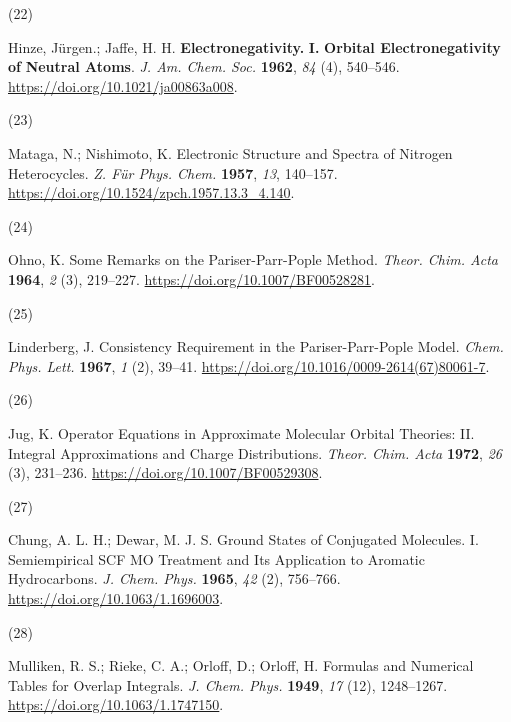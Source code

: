 \documentclass[
  number,
  3p]{elsarticle}
\newlength{\cslhangindent}
\newlength{\csllabelwidth}
\newlength{\cslentryspacingunit} %
\newenvironment{CSLReferences}[2] %
 {%
  \setlength{\parindent}{0pt}
  \ifodd #1
  \let\oldpar\par
  \def\par{\hangindent=\cslhangindent\oldpar}
  \fi
  \setlength{\parskip}{#2\cslentryspacingunit}
 }%
 {}
\newcommand{\CSLLeftMargin}[1]{\parbox[t]{\csllabelwidth}{#1}}
\newcommand{\CSLRightInline}[1]{\parbox[t]{\linewidth - \csllabelwidth}{#1}\break}
\begin{document}
\begin{CSLReferences}{0}{0}
\leavevmode{}%
\CSLLeftMargin{(22) }%
\CSLRightInline{Hinze, Jürgen.; Jaffe, H. H. \textbf{Electronegativity.}
{\textbf{I}}\textbf{.} {\textbf{Orbital Electronegativity}} \textbf{of}
{\textbf{Neutral Atoms}}. \emph{J. Am. Chem. Soc.} \textbf{1962},
\emph{84} (4), 540--546. \url{https://doi.org/10.1021/ja00863a008}.}

\leavevmode{}%
\CSLLeftMargin{(23) }%
\CSLRightInline{Mataga, N.; Nishimoto, K. Electronic {Structure} and
{Spectra} of {Nitrogen Heterocycles}. \emph{Z. Für Phys. Chem.}
\textbf{1957}, \emph{13}, 140--157.
\url{https://doi.org/10.1524/zpch.1957.13.3_4.140}.}

\leavevmode{}%
\CSLLeftMargin{(24) }%
\CSLRightInline{Ohno, K. Some Remarks on the {Pariser-Parr-Pople}
Method. \emph{Theor. Chim. Acta} \textbf{1964}, \emph{2} (3), 219--227.
\url{https://doi.org/10.1007/BF00528281}.}

\leavevmode{}%
\CSLLeftMargin{(25) }%
\CSLRightInline{Linderberg, J. Consistency Requirement in the
{Pariser-Parr-Pople} Model. \emph{Chem. Phys. Lett.} \textbf{1967},
\emph{1} (2), 39--41.
\url{https://doi.org/10.1016/0009-2614(67)80061-7}.}

\leavevmode{}%
\CSLLeftMargin{(26) }%
\CSLRightInline{Jug, K. Operator Equations in Approximate Molecular
Orbital Theories: {II}. {Integral} Approximations and Charge
Distributions. \emph{Theor. Chim. Acta} \textbf{1972}, \emph{26} (3),
231--236. \url{https://doi.org/10.1007/BF00529308}.}

\leavevmode{}%
\CSLLeftMargin{(27) }%
\CSLRightInline{Chung, A. L. H.; Dewar, M. J. S. Ground {States} of
{Conjugated Molecules}. {I}. {Semiempirical SCF MO Treatment} and {Its
Application} to {Aromatic Hydrocarbons}. \emph{J. Chem. Phys.}
\textbf{1965}, \emph{42} (2), 756--766.
\url{https://doi.org/10.1063/1.1696003}.}

\leavevmode{}%
\CSLLeftMargin{(28) }%
\CSLRightInline{Mulliken, R. S.; Rieke, C. A.; Orloff, D.; Orloff, H.
Formulas and {Numerical Tables} for {Overlap Integrals}. \emph{J. Chem.
Phys.} \textbf{1949}, \emph{17} (12), 1248--1267.
\url{https://doi.org/10.1063/1.1747150}.}


\end{CSLReferences}
\end{document}
